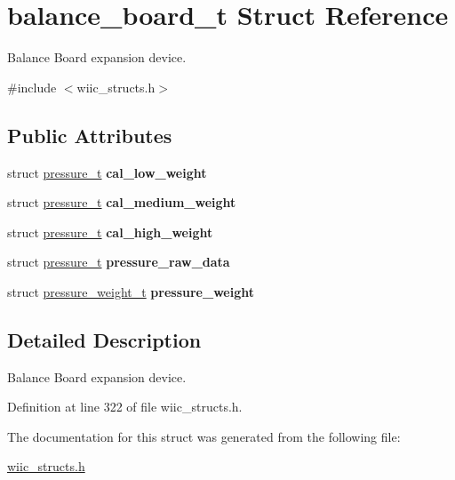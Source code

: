 \hypertarget{structbalance__board__t}{\section{balance\-\_\-board\-\_\-t Struct Reference}
\label{structbalance__board__t}
}


Balance Board expansion device.  




{\ttfamily \#include $<$wiic\-\_\-structs.\-h$>$}

\subsection*{Public Attributes}
\begin{DoxyCompactItemize}
\item 
\hypertarget{structbalance__board__t_a0ba9ccde483558b820c8062757864bad}{struct \hyperlink{structpressure__t}{pressure\-\_\-t} {\bfseries cal\-\_\-low\-\_\-weight}}\label{structbalance__board__t_a0ba9ccde483558b820c8062757864bad}

\item 
\hypertarget{structbalance__board__t_a04836ca22dad56206232b1b7836ff023}{struct \hyperlink{structpressure__t}{pressure\-\_\-t} {\bfseries cal\-\_\-medium\-\_\-weight}}\label{structbalance__board__t_a04836ca22dad56206232b1b7836ff023}

\item 
\hypertarget{structbalance__board__t_a9efb8f44640fa6ef0b459322335fad93}{struct \hyperlink{structpressure__t}{pressure\-\_\-t} {\bfseries cal\-\_\-high\-\_\-weight}}\label{structbalance__board__t_a9efb8f44640fa6ef0b459322335fad93}

\item 
\hypertarget{structbalance__board__t_a758120272d9ea7e0257ff8106d746e70}{struct \hyperlink{structpressure__t}{pressure\-\_\-t} {\bfseries pressure\-\_\-raw\-\_\-data}}\label{structbalance__board__t_a758120272d9ea7e0257ff8106d746e70}

\item 
\hypertarget{structbalance__board__t_af1fc954c03bb9c1aec63c57d732c7e0e}{struct \hyperlink{structpressure__weight__t}{pressure\-\_\-weight\-\_\-t} {\bfseries pressure\-\_\-weight}}\label{structbalance__board__t_af1fc954c03bb9c1aec63c57d732c7e0e}

\end{DoxyCompactItemize}


\subsection{Detailed Description}
Balance Board expansion device. 

Definition at line 322 of file wiic\-\_\-structs.\-h.



The documentation for this struct was generated from the following file\-:\begin{DoxyCompactItemize}
\item 
\hyperlink{wiic__structs_8h}{wiic\-\_\-structs.\-h}\end{DoxyCompactItemize}

